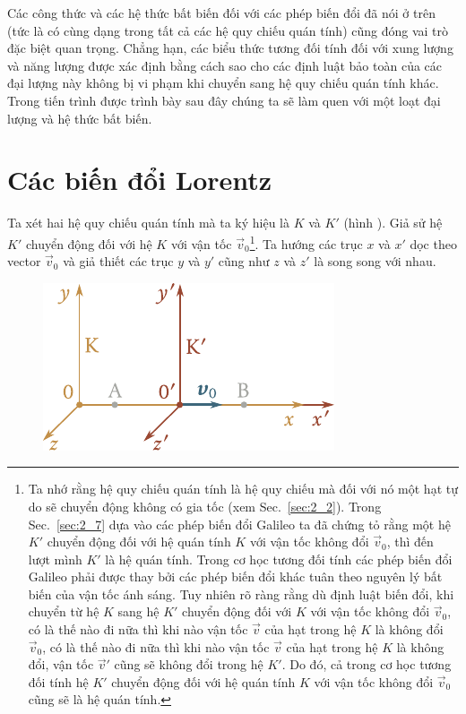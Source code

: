 Các công thức và các hệ thức bất biến đối với các phép biến đổi đã nói ở trên (tức là có cùng dạng trong tất cả các hệ quy chiếu quán tính) cũng đóng vai trò đặc biệt quan trọng. Chẳng hạn, các biểu thức tương đối tính đối với xung lượng và năng lượng được xác định bằng cách sao cho các định luật bảo toàn của các đại lượng này không bị vi phạm khi chuyển sang hệ quy chiếu quán tính khác. Trong tiến trình được trình bày sau đây chúng ta sẽ làm quen với một loạt đại lượng và hệ thức bất biến.

\section{Các biến đổi Lorentz}\label{sec:8_2}

Ta xét hai hệ quy chiếu quán tính mà ta ký hiệu là $K$ và $K'$ (hình ). Giả sử hệ $K'$ chuyển động đối với hệ $K$ với vận tốc $\vec{v}_0$\footnote{Ta nhớ rằng hệ quy chiếu quán tính là hệ quy chiếu mà đối với nó một hạt tự do sẽ chuyển động không có gia tốc (xem Sec.~\ref{sec:2_2}). Trong Sec.~\ref{sec:2_7} dựa vào các phép biến đổi Galileo ta đã chứng tỏ rằng một hệ $K'$ chuyển động đối với hệ quán tính $K$ với vận tốc không đổi $\vec{v}_0$, thì đến lượt mình $K'$ là hệ quán tính. Trong cơ học tương đối tính các phép biến đổi Galileo phải được thay bởi các phép biến đổi khác tuân theo nguyên lý bất biến của vận tốc ánh sáng. Tuy nhiên rõ ràng rằng dù định luật biến đổi, khi chuyển từ hệ $K$ sang hệ $K'$ chuyển động đối với $K$ với vận tốc không đổi $\vec{v}_0$, có là thế nào đi nữa thì khi nào vận tốc $\vec{v}$ của hạt trong hệ $K$ là không đổi $\vec{v}_0$, có là thế nào đi nữa thì khi nào vận tốc $\vec{v}$ của hạt trong hệ $K$ là không đổi, vận tốc $\vec{v}'$ cũng sẽ không đổi trong hệ $K'$. Do đó, cả trong cơ học tương đối tính hệ $K'$ chuyển động đối với hệ quán tính $K$ với vận tốc không đổi $\vec{v}_0$ cũng sẽ là hệ quán tính.}. Ta hướng các trục $x$ và $x'$ dọc theo vector $\vec{v}_0$ và giả thiết các trục $y$ và $y'$ cũng như $z$ và $z'$ là song song với nhau.

\begin{figure}[!htb]
	\begin{center}
		\includegraphics[scale=0.95]{figures/ch_08/fig_8_2.pdf}
		\caption[]{}
		\label{fig:8_2}
	\end{center}
\end{figure}

